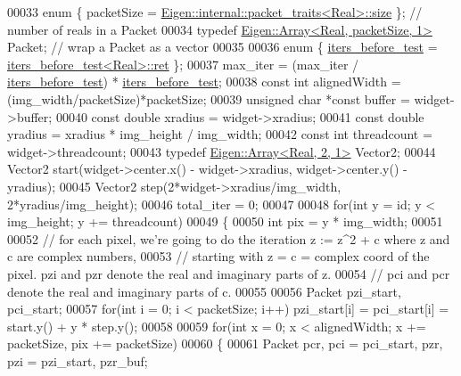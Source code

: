 \begin{DoxyCode}
00033   \textcolor{keyword}{enum} \{ packetSize = \hyperlink{struct_eigen_1_1internal_1_1packet__traits}{Eigen::internal::packet\_traits<Real>::size} 
      \}; \textcolor{comment}{// number of reals in a Packet}
00034   \textcolor{keyword}{typedef} \hyperlink{group___core___module_class_eigen_1_1_array}{Eigen::Array<Real, packetSize, 1>} Packet; \textcolor{comment}{// wrap a Packet as a
       vector}
00035 
00036   \textcolor{keyword}{enum} \{ \hyperlink{structiters__before__test}{iters\_before\_test} = \hyperlink{structiters__before__test}{iters\_before\_test<Real>::ret} \};
00037   max\_iter = (max\_iter / \hyperlink{structiters__before__test}{iters\_before\_test}) * \hyperlink{structiters__before__test}{iters\_before\_test};
00038   \textcolor{keyword}{const} \textcolor{keywordtype}{int} alignedWidth = (img\_width/packetSize)*packetSize;
00039   \textcolor{keywordtype}{unsigned} \textcolor{keywordtype}{char} *\textcolor{keyword}{const} buffer = widget->buffer;
00040   \textcolor{keyword}{const} \textcolor{keywordtype}{double} xradius = widget->xradius;
00041   \textcolor{keyword}{const} \textcolor{keywordtype}{double} yradius = xradius * img\_height / img\_width;
00042   \textcolor{keyword}{const} \textcolor{keywordtype}{int} threadcount = widget->threadcount;
00043   \textcolor{keyword}{typedef} \hyperlink{group___core___module_class_eigen_1_1_array}{Eigen::Array<Real, 2, 1>} Vector2;
00044   Vector2 start(widget->center.x() - widget->xradius, widget->center.y() - yradius);
00045   Vector2 step(2*widget->xradius/img\_width, 2*yradius/img\_height);
00046   total\_iter = 0;
00047 
00048   \textcolor{keywordflow}{for}(\textcolor{keywordtype}{int} y = \textcolor{keywordtype}{id}; y < img\_height; y += threadcount)
00049   \{
00050     \textcolor{keywordtype}{int} pix = y * img\_width;
00051 
00052     \textcolor{comment}{// for each pixel, we're going to do the iteration z := z^2 + c where z and c are complex numbers, }
00053     \textcolor{comment}{// starting with z = c = complex coord of the pixel. pzi and pzr denote the real and imaginary parts of
       z.}
00054     \textcolor{comment}{// pci and pcr denote the real and imaginary parts of c.}
00055 
00056     Packet pzi\_start, pci\_start;
00057     \textcolor{keywordflow}{for}(\textcolor{keywordtype}{int} i = 0; i < packetSize; i++) pzi\_start[i] = pci\_start[i] = start.y() + y * step.y();
00058 
00059     \textcolor{keywordflow}{for}(\textcolor{keywordtype}{int} x = 0; x < alignedWidth; x += packetSize, pix += packetSize)
00060     \{
00061       Packet pcr, pci = pci\_start, pzr, pzi = pzi\_start, pzr\_buf;

\end{DoxyCode}
